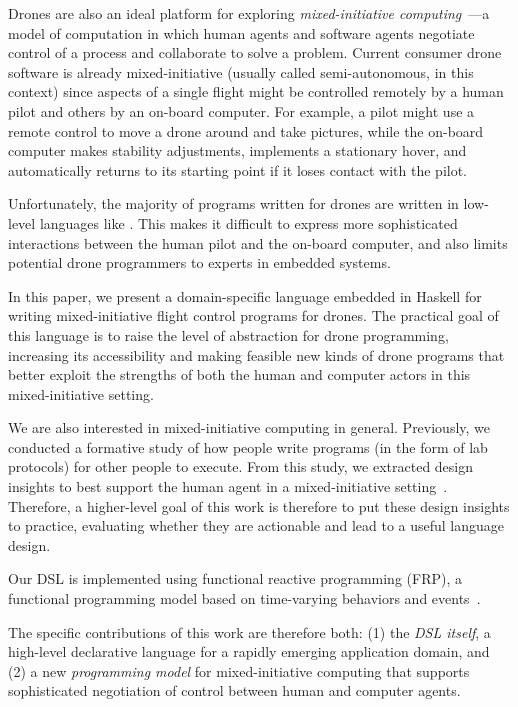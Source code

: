 \documentclass{sig-alternate-05-2015}
\begin{document}
Drones are also an ideal platform for exploring \emph{mixed-initiative
computing}~\cite{H99principles}---a model of computation in which human agents
and software agents negotiate control of a process and collaborate to solve a
problem.
%
Current consumer drone software is already mixed-initiative (usually called
semi-autonomous, in this context) since aspects of a single flight might be
controlled remotely by a human pilot and others by an on-board computer. For
example, a pilot might use a remote control to move a drone around and take
pictures, while the on-board computer makes stability adjustments, implements a
stationary hover, and automatically returns to its starting point if it loses
contact with the pilot.

Unfortunately, the majority of programs written for drones are written in
low-level languages like . This makes it difficult to express more
sophisticated interactions between the human pilot and the on-board computer,
and also limits potential drone programmers to experts in embedded systems.

In this paper, we present a domain-specific language embedded in Haskell for
writing mixed-initiative flight control programs for drones. The practical goal
of this language is to raise the level of abstraction for drone programming,
increasing its accessibility and making feasible new kinds of drone programs
that better exploit the strengths of both the human and computer actors in this
mixed-initiative setting.

We are also interested in mixed-initiative computing in general. Previously, we
conducted a formative study of how people write programs (in the form of lab
protocols) for other people to execute. From this study, we extracted design
insights to best support the human agent in a mixed-initiative
setting~\cite{ABW15prog}.
%
Therefore, a higher-level goal of this work is therefore to put these design
insights to practice, evaluating whether they are actionable and lead to a
useful language design.

Our DSL is implemented using functional reactive programming (FRP), a
functional programming model based on time-varying behaviors and
events~\cite{EH97fra,WH00frp}.

The specific contributions of this work are therefore both: (1) the \emph{DSL
itself}, a high-level declarative language for a rapidly emerging application
domain, and (2) a new \emph{programming model} for mixed-initiative computing
that supports sophisticated negotiation of control between human and computer
agents.
\end{document}
